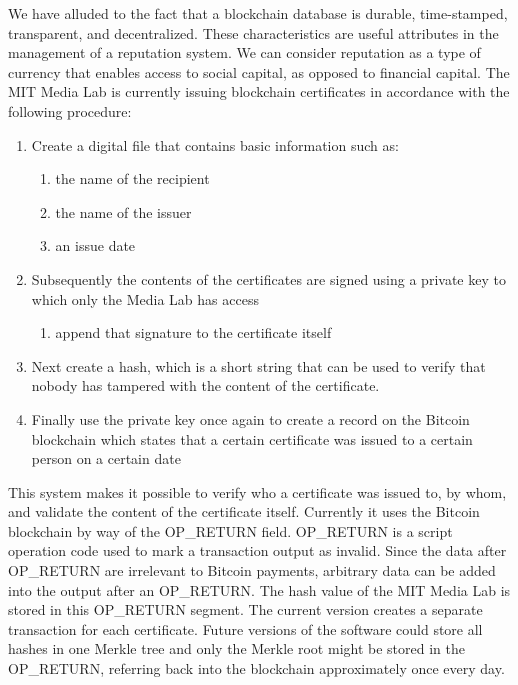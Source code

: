 We have alluded to the fact that a blockchain database is durable, time-stamped, transparent, and decentralized. 
These characteristics are useful attributes in the management of a reputation system. 
We can consider reputation as a type of currency that enables access to social capital, as opposed to financial capital.
The MIT Media Lab is currently issuing blockchain certificates in accordance with the following procedure:

\begin{enumerate}
\item Create a digital file that contains basic information such as:
\begin{enumerate}
    \item the name of the recipient
    \item the name of the issuer
    \item an issue date
\end{enumerate}
\item Subsequently the contents of the certificates are signed using a private key to which only the Media Lab has access 
\begin{enumerate}
    \item append that signature to the certificate itself
\end{enumerate}
\item Next create a hash, which is a short string that can be used to verify that nobody has tampered with the content of the certificate. 
\item Finally use the private key once again to create a record on the Bitcoin blockchain which states that a certain certificate was issued to a certain person on a certain date
\end{enumerate}

This system makes it possible to verify who a certificate was issued to, by whom, and validate the content of the certificate itself. 
Currently it uses the Bitcoin blockchain by way of the OP\_RETURN field. 
OP\_RETURN is a script operation code used to mark a transaction output as invalid. 
Since the data after OP\_RETURN are irrelevant to Bitcoin payments, arbitrary data can be added into the output after an OP\_RETURN. 
The hash value of the MIT Media Lab is stored in this OP\_RETURN segment.
The current version creates a separate transaction for each certificate.
Future versions of the software could store all hashes in one Merkle tree and only the Merkle root might be stored in the OP\_RETURN, referring back into the blockchain approximately once every day. 

